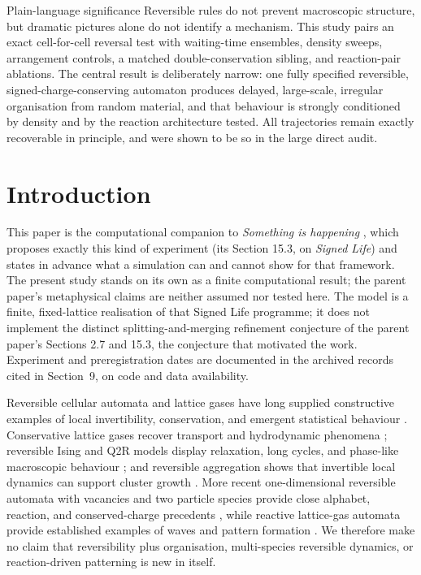 \documentclass[11pt,a4paper]{article}
\begin{document}
\begin{sigbox}{Plain-language significance}
Reversible rules do not prevent macroscopic structure, but dramatic pictures alone do not identify a mechanism. This study pairs an exact cell-for-cell reversal test with waiting-time ensembles, density sweeps, arrangement controls, a matched double-conservation sibling, and reaction-pair ablations. The central result is deliberately narrow: one fully specified reversible, signed-charge-conserving automaton produces delayed, large-scale, irregular organisation from random material, and that behaviour is strongly conditioned by density and by the reaction architecture tested. All trajectories remain exactly recoverable in principle, and were shown to be so in the large direct audit.
\end{sigbox}

\section{Introduction}
This paper is the computational companion to \emph{Something is happening} \citep{Bartlett2026ZWS}, which proposes exactly this kind of experiment (its Section 15.3, on \emph{Signed Life}) and states in advance what a simulation can and cannot show for that framework. The present study stands on its own as a finite computational result; the parent paper's metaphysical claims are neither assumed nor tested here. The model is a finite, fixed-lattice realisation of that Signed Life programme; it does not implement the distinct splitting-and-merging refinement conjecture of the parent paper's Sections 2.7 and 15.3, the conjecture that motivated the work. Experiment and preregistration dates are documented in the archived records cited in Section~9, on code and data availability.

Reversible cellular automata and lattice gases have long supplied constructive examples of local invertibility, conservation, and emergent statistical behaviour \citep{FredkinToffoli1982,Margolus1984,Vichniac1984,ToffoliMargolus1987,ToffoliMargolus1990}. Conservative lattice gases recover transport and hydrodynamic phenomena \citep{HPP1973,FrischHasslacherPomeau1986,RothmanZaleski1994,BoonEtAl1996}; reversible Ising and Q2R models display relaxation, long cycles, and phase-like macroscopic behaviour \citep{Creutz1986,Takesue1987,UrbinaRica2016,Urbina2020,MontalvaMedelRicaUrbina2020}; and reversible aggregation shows that invertible local dynamics can support cluster growth \citep{DSouzaMargolus1999}. More recent one-dimensional reversible automata with vacancies and two particle species provide close alphabet, reaction, and conserved-charge precedents \citep{MedenjakPopkovProsen2019,KlobasProsen2022}, while reactive lattice-gas automata provide established examples of waves and pattern formation \citep{KapralLawniczakMasiar1991}. We therefore make no claim that reversibility plus organisation, multi-species reversible dynamics, or reaction-driven patterning is new in itself.
\end{document}
